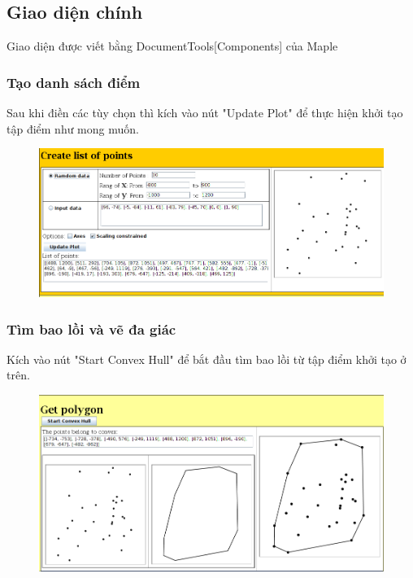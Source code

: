 \documentclass[12pt]{article}
\begin{document}
      \subsection{Giao diện chính}
        Giao diện được viết bằng DocumentTools[Components] của Maple
        \subsubsection{Tạo danh sách điểm}
          Sau khi điền các tùy chọn thì kích vào nút "Update Plot" để thực hiện khởi tạo tập điểm như mong muốn.
          \begin{figure}[h]
            \includegraphics[scale=0.4]{Image/create}
          \end{figure}
        \subsubsection{Tìm bao lồi và vẽ đa giác}
          Kích vào nút "Start Convex Hull" để bắt đầu tìm bao lồi từ tập điểm khởi tạo ở trên.
          \begin{figure}[h]
            \includegraphics[scale=0.4]{Image/poly}
          \end{figure}
\end{document}

